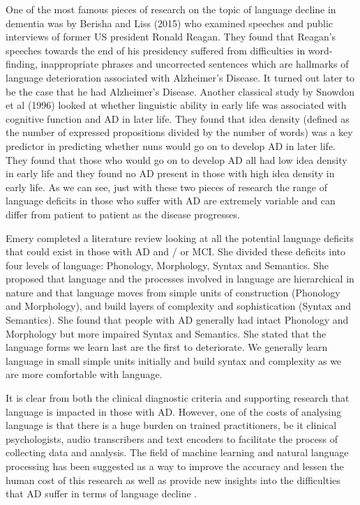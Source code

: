 \documentclass{article}
\begin{document}
\par
One of the most famous pieces of research on the topic of language decline in dementia was by Berisha and Liss (2015) \cite{Berisha2015} who examined speeches and public interviews of former US president Ronald Reagan. They found that Reagan's speeches towards the end of his presidency suffered from difficulties in word-finding, inappropriate phrases and uncorrected sentences which are hallmarks of language deterioration associated with Alzheimer's Disease. It turned out later to be the case that he had Alzheimer's Disease. Another classical study by Snowdon et al (1996) \cite{Snowdon1996} looked at whether linguistic ability in early life was associated with cognitive function and AD in later life. They found that idea density (defined as the number of expressed propositions divided by the number of words) was a key predictor in predicting whether nuns would go on to develop AD in later life. They found that those who would go on to develop AD all had low idea density in early life and they found no AD present in those with high idea density in early life. As we can see, just with these two pieces of research the range of language deficits in those who suffer with AD are extremely variable and can differ from patient to patient as the disease progresses. \newline
\par
Emery \cite{Emery2000} completed a literature review looking at all the potential language deficits that could exist in those with AD and / or MCI. She divided these deficits into four levels of language: Phonology, Morphology, Syntax and Semantics. She proposed that language and the processes involved in language are hierarchical in nature and that language moves from simple units of construction (Phonology and Morphology), and build layers of complexity and sophistication (Syntax and Semantics). She found that people with AD generally had intact Phonology and Morphology but more impaired Syntax and Semantics. She stated that the language forms we learn last are the first to deteriorate. We generally learn language in small simple units initially and build syntax and complexity as we are more comfortable with language.\newline
\par
It is clear from both the clinical diagnostic criteria and supporting research that language is impacted in those with AD. However, one of the costs of analysing language is that there is a huge burden on trained practitioners, be it clinical psychologists, audio transcribers and text encoders to facilitate the process of collecting data and analysis. The field of machine learning and natural language processing has been suggested as a way to improve the accuracy and lessen the human cost of this research as well as provide new insights into the difficulties that AD suffer in terms of language decline \cite{Boschi2017}. \newline
\end{document}
